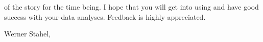 \documentclass[11pt]{article}
\begin{document}


\vspace{10mm}\noindent
{\small
{} of the story for the time being. I hope that you will
get into using  and have good success with your data analyses.
Feedback is highly appreciated.


Werner Stahel, 
}
\end{document}
